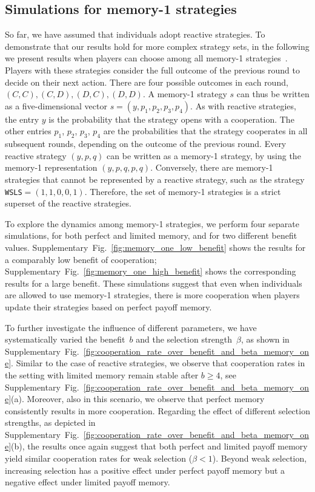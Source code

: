 \documentclass[11pt]{article}
\def\strategy{s}
\theoremstyle{plainCl1}
\theoremstyle{plainCl2}
\begin{document}
\subsection{Simulations for memory-1 strategies}\label{section:memory_one}

So far, we have assumed that individuals adopt reactive strategies.
To demonstrate that our results hold for more complex strategy sets, 
in the following we present results when players can choose among all memory-1 strategies~\citep{sigmund2010calculus}. 
Players with these strategies consider the full outcome of the
previous round to decide on their next action. 
There are four possible outcomes in each
round,  \((C, C), (C, D), (D, C), (D, D)\). 
A memory-1 strategy \(\strategy\) can thus be
written as a five-dimensional vector \(\strategy=(y, p_1, p_2, p_3, p_4)\). 
As with reactive strategies, the entry \(y\) is the probability that the strategy opens with a cooperation.
The other entries \(p_1\), \(p_2\), \(p_3\), \(p_4\) are the probabilities that the strategy
cooperates in all subsequent rounds, depending on the outcome of the previous round.
Every reactive strategy $(y,p,q)$ can be written as a memory-1 strategy, by using the memory-1 representation $(y,p,q,p,q)$.
Conversely, there are memory-1 strategies that cannot be represented by a reactive strategy, such as the strategy \texttt{WSLS}$=(1,1,0,0,1)$. 
Therefore, the set of memory-1 strategies is a strict superset of the reactive strategies. 

To explore the dynamics among memory-1 strategies, we perform four separate simulations, for both perfect and limited memory, and for two different benefit values. 
Supplementary~Fig.~\ref{fig:memory_one_low_benefit} shows the results for a comparably low benefit of cooperation; 
Supplementary~Fig.~\ref{fig:memory_one_high_benefit} shows the corresponding results for a large benefit. 
These simulations suggest that even when individuals
are allowed to use memory-1 strategies, there is more cooperation when players update their strategies based on perfect payoff memory. 

To further investigate the influence of different parameters, we have
systematically varied the benefit~$b$ and the selection strength~$\beta$, as
shown in Supplementary~Fig.~\ref{fig:cooperation_rate_over_benefit_and_beta_memory_one}.
Similar to the case of reactive strategies, we observe that cooperation rates in the setting with limited memory remain stable after $b\!\ge\!4$, see Supplementary~Fig.~\ref{fig:cooperation_rate_over_benefit_and_beta_memory_one}(a). Moreover,
also in this scenario, we observe that perfect memory consistently results
in more cooperation.
Regarding the effect of different selection strengths, as depicted in
Supplementary~Fig.~\ref{fig:cooperation_rate_over_benefit_and_beta_memory_one}(b), the results
once again suggest that both perfect and limited payoff memory yield similar
cooperation rates for weak selection (\(\beta \!<\! 1\)). Beyond weak selection, increasing
selection has a positive effect under perfect payoff memory but a negative
effect under limited payoff memory.
\end{document}
